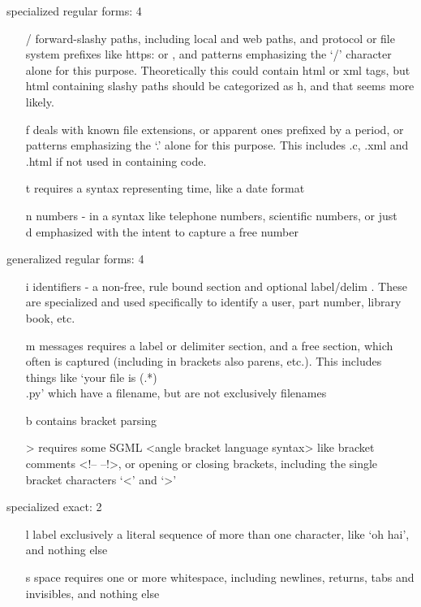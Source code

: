 specialized regular forms: 4
\begin{itemize}
\item[ / ] forward-slashy paths, including local and web paths, and protocol or file system prefixes like https: or , and patterns emphasizing the `/' character alone for this purpose.  Theoretically this could contain html or xml tags, but html containing slashy paths should be categorized as h, and that seems more likely.
\item[ f ] deals with known file extensions, or apparent ones prefixed by a period, or patterns emphasizing the `.'  alone for this purpose.  This includes .c, .xml and .html if not used in containing code.
\item[ t ] requires a syntax representing time, like a date format
\item[ n ] numbers - in a syntax like telephone numbers, scientific numbers, or just \\d emphasized with the intent to capture a free number
\end{itemize}

generalized regular forms: 4
\begin{itemize}
\item[ i ] identifiers - a non-free, rule bound section and optional label/delim .  These are specialized and used specifically to identify a user, part number, library book, etc.
\item[ m ] messages requires a label or delimiter section, and a free section, which often is captured (including in brackets also parens, etc.).  This includes things like `your file is (.*)\\.py' which have a filename, but are not exclusively filenames
\item[ b ] contains bracket parsing
\item[ > ] requires some SGML <angle bracket language syntax> like bracket comments <!-- --!>, or opening or closing brackets, including the single bracket characters `<' and `>'
\end{itemize}


specialized exact: 2
\begin{itemize}
\item[ l ] label  exclusively a literal sequence of more than one character, like `oh hai', and nothing else
\item[ s ] space  requires one or more whitespace, including newlines, returns, tabs and invisibles, and nothing else
\end{itemize}


